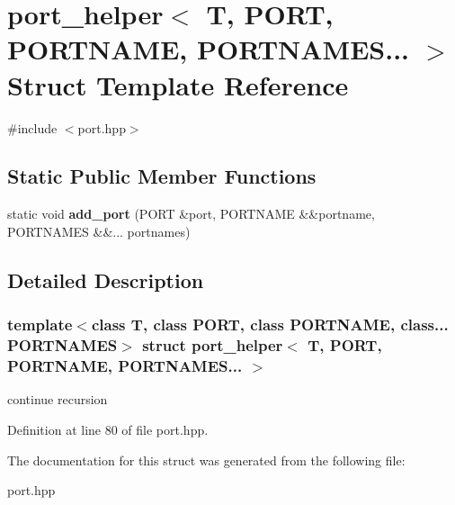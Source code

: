 \hypertarget{structport__helper_3_01_t_00_01_p_o_r_t_00_01_p_o_r_t_n_a_m_e_00_01_p_o_r_t_n_a_m_e_s_8_8_8_01_4}{}\section{port\+\_\+helper$<$ T, P\+O\+RT, P\+O\+R\+T\+N\+A\+ME, P\+O\+R\+T\+N\+A\+M\+ES... $>$ Struct Template Reference}
\label{structport__helper_3_01_t_00_01_p_o_r_t_00_01_p_o_r_t_n_a_m_e_00_01_p_o_r_t_n_a_m_e_s_8_8_8_01_4}


{\ttfamily \#include $<$port.\+hpp$>$}

\subsection*{Static Public Member Functions}
\begin{DoxyCompactItemize}
\item 
\hypertarget{structport__helper_3_01_t_00_01_p_o_r_t_00_01_p_o_r_t_n_a_m_e_00_01_p_o_r_t_n_a_m_e_s_8_8_8_01_4_aee706e0e28b7b90792e7853de2d3a12b}{}\label{structport__helper_3_01_t_00_01_p_o_r_t_00_01_p_o_r_t_n_a_m_e_00_01_p_o_r_t_n_a_m_e_s_8_8_8_01_4_aee706e0e28b7b90792e7853de2d3a12b} 
static void {\bfseries add\+\_\+port} (P\+O\+RT \&port, P\+O\+R\+T\+N\+A\+ME \&\&portname, P\+O\+R\+T\+N\+A\+M\+ES \&\&... portnames)
\end{DoxyCompactItemize}


\subsection{Detailed Description}
\subsubsection*{template$<$class T, class P\+O\+RT, class P\+O\+R\+T\+N\+A\+ME, class... P\+O\+R\+T\+N\+A\+M\+ES$>$\newline
struct port\+\_\+helper$<$ T, P\+O\+R\+T, P\+O\+R\+T\+N\+A\+M\+E, P\+O\+R\+T\+N\+A\+M\+E\+S... $>$}

continue recursion 

Definition at line 80 of file port.\+hpp.



The documentation for this struct was generated from the following file\+:\begin{DoxyCompactItemize}
\item 
port.\+hpp\end{DoxyCompactItemize}

